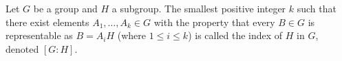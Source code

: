 Let $G$ be a group and $H$ a subgroup. The smallest positive integer $k$ such that there exist elements $A_1, \ldots, A_k \in G$ with the property that every $B \in G$ is representable as $B = A_i H$ (where $1 \leq i \leq k$) is called the index of $H$ in $G$, denoted $[G : H]$.

